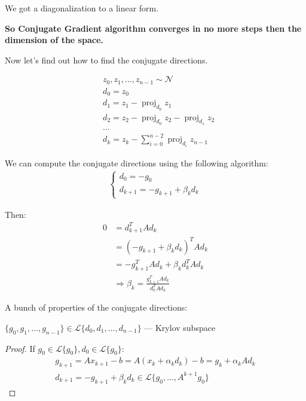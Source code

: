 We got a diagonalization to a linear form.


\textbf{So Conjugate Gradient algorithm converges in no more steps then the dimension of the space.}

Now let's find out how to find the conjugate directions.

\begin{align*}
    &z_0, z_1, \ldots, z_{n-1} \sim \mathcal{N} \\ 
    &d_0 = z_0 \\ 
    &d_1 = z_1 - \operatorname{proj}_{d_0} z_1 \\
    &d_2 = z_2 - \operatorname{proj}_{d_0} z_2 - \operatorname{proj}_{d_1} z_2 \\
    &\ldots \\
    &d_k = z_k - \sum^{n-2}_{i=0} \operatorname{proj}_{d_i} z_{n - 1}
\end{align*}

We can compute the conjugate directions using the following algorithm:
\begin{gather*}
    \begin{cases}
        d_0 = -g_0 \\ 
        d_{k+1} = -g_{k+1} + \beta_k d_k
    \end{cases}
\end{gather*}

Then: 
\begin{align*}
    0 &= d^T_{k+1} A d_k \\ 
    &= (-g_{k+1} + \beta_k d_k)^T A d_k \\ 
    &= -g_{k+1}^T A d_k + \beta_k d_k^T A d_k \\
    &\Longrightarrow \beta_k = \frac{g_{k+1}^T A d_k}{d_k^T A d_k}
\end{align*}

A bunch of properties of the conjugate directions:

\begin{theorem}
    $\{g_0, g_1, \ldots, g_{n-1}\} \in \mathcal{L} \{ d_0, d_1, \ldots, d_{n-1} \}$ --- Krylov subspace
\end{theorem}
\begin{proof}
    If $g_0 \in \mathcal{L} \{g_0\}, d_0 \in \mathcal{L} \{g_0\}$: 
    \begin{gather*}
        g_{k+1} = A x_{k+1} - b = A (x_k + \alpha_k d_k) - b = g_k + \alpha_k A d_k \\ 
        d_{k+1} = -g_{k+1} + \beta_k d_k \in \mathcal{L} \{ g_0, \ldots, A^{k+1} g_0 \}
    \end{gather*}
\end{proof}


